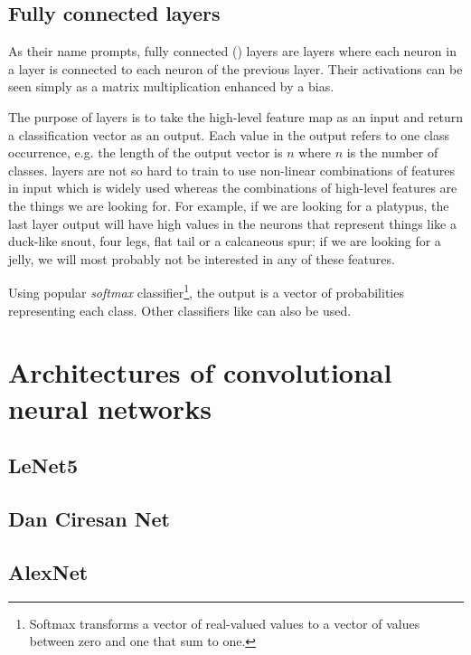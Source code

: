 \subsection{Fully connected layers}
\label{fc-layers}

As their name prompts, fully connected () layers are layers where each neuron in a layer is connected to each neuron of the previous layer. Their activations can be seen simply as a matrix multiplication enhanced by a bias.  

The purpose of  layers is to take the high-level feature map as an input and return a classification vector as an output. Each value in the output refers to one class occurrence, e.g. the length of the output vector is $n$ where $n$ is the number of classes.  layers are not so hard to train to use non-linear combinations of features in input which is widely used whereas the combinations of high-level features are the things we are looking for. For example, if we are looking for a platypus, the last layer output will have high values in the neurons that represent things like a duck-like snout, four legs, flat tail or a calcaneous spur; if we are looking for a jelly, we will most probably not be interested in any of these features. 

Using popular \textit{softmax} classifier\footnote{Softmax transforms a vector of real-valued values to a vector of values between zero and one that sum to one.}, the output is a vector of probabilities representing each class. Other classifiers like  can also be used. 


\section{Architectures of convolutional neural networks}
\label{cnn-architectures}

\subsection{LeNet5} %
\label{lenet}

\subsection{Dan Ciresan Net}
\label{ciresan}

\subsection{AlexNet} %
\label{alexnet}

